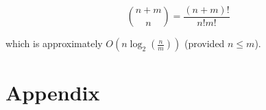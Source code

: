 \documentclass[12pt]{article}
\begin{document}
\begin{equation}
    \binom{n+m}{n} = \frac{(n+m)!}{n!m!}
\end{equation}

which is approximately $O(n\log_2{(\frac{n}{m})})$ (provided $n\le m$).



\section*{Appendix}









\end{document}

